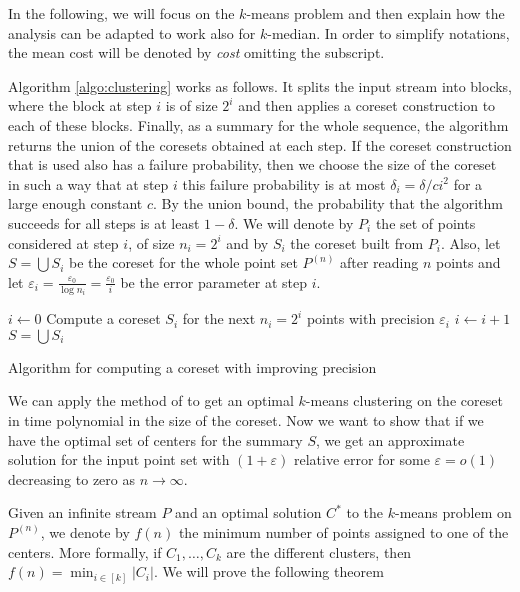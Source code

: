 \documentclass[a4paper,11pt,oneside,english,onecolumn]{article}
\theoremstyle{definition}
\newcommand{\REAL}{\ensuremath{\mathbb{R}}}
\newcommand{\eps}{\ensuremath{\varepsilon}}
\begin{document}
In the following, we will focus on the $k$-means problem and then explain how the analysis can be adapted to work also for $k$-median. In order to simplify notations, the mean cost will be denoted by \emph{cost} omitting the subscript.

Algorithm \ref{algo:clustering} works as follows. It splits the input stream into blocks, where the block at step $i$ is of size $2^i$ and then applies a coreset construction to each of these blocks. Finally, as a summary for the whole sequence, the algorithm returns the union of the coresets obtained at each step. If the coreset construction that is used also has a failure probability, then we choose the size of the coreset in such a way that at step $i$ this failure probability is at most $\delta_i = \delta/c i^2$ for a large enough constant $c$. By the union bound, the probability that the algorithm succeeds for all steps is at least $1 - \delta$. We will denote by $P_i$ the set of points considered at step $i$, of size $n_i = 2^i$ and by $S_i$ the coreset built from $P_i$. Also, let $S = \bigcup S_i$ be the coreset for the whole point set $P^{(n)}$ after reading $n$ points and let $\eps_i = \frac{\eps_0}{\log n_i} = \frac{\eps_0}{i}$ be the error parameter at step $i$. 

\begin{algorithm}
\DontPrintSemicolon \KwIn{A sequence $P^{(n)}=\{p_1, p_2, \ldots, p_n \}$ of points, $p_i\in\REAL^d$}
$i \gets 0$\;
 {
  Compute a coreset $S_i$ for the next $n_i=2^i$ points with precision $\eps_i$ \;
  $i \gets i+1$\;
}
\Return $S=\bigcup S_i$\;
\caption{Algorithm for computing a coreset with improving precision}
\label{algo:clustering}
\end{algorithm}

We can apply the method of \cite{ExactKMeans} to get an optimal $k$-means clustering on the coreset in time polynomial in the size of the coreset. Now we want to show that if we have the optimal set of centers for the summary $S$, we get an approximate solution for the input point set with $(1+\eps)$ relative error for some $\eps=o(1)$ decreasing to zero as $n\to \infty$.

Given an infinite stream $P$ and an optimal solution $C^*$ to the $k$-means problem on $P^{(n)}$, we denote by $f(n)$ the minimum number of points assigned to one of the centers. More formally, if $C_1, \ldots, C_k$ are the different clusters, then $f(n)= \min_{i \in [k]} |C_i| $. We will prove the following theorem
\end{document}
